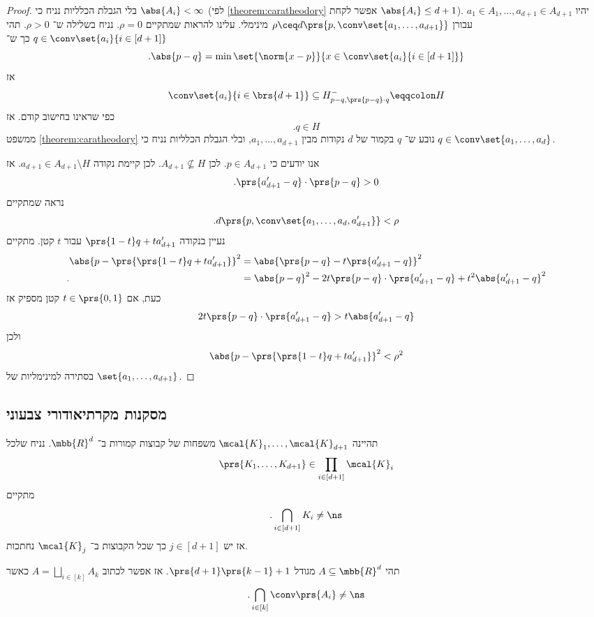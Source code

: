 \documentclass[a4paper,10pt,twoside,openany]{book}
\begin{document}
\begin{proof}
בלי הגבלת הכלליות נניח כי
$\abs{A_i} < \infty$
(לפי \ref{theorem:caratheodory} אפשר לקחת
$\abs{A_i} \leq d+1$).
יהיו
$a_1 \in A_1, \ldots, a_{d+1} \in A_{d+1}$
עבורן
$\rho \ceq d\prs{p, \conv\set{a_1, \ldots, a_{d+1}}}$
מינימלי.
עלינו להראות שמתקיים
$\rho = 0$.
נניח בשלילה ש־%
$\rho > 0$.
תהי
$q \in \conv\set{a_i}{i \in [d+1]}$
כך ש־%
\[\text{.} \abs{p-q} = \min\set{\norm{x-p}}{x \in \conv\set{a_i}{i \in [d+1]}}\]
אז
\[\conv\set{a_i}{i \in \brs{d+1}} \subseteq H_{p-q, \prs{p-q} \cdot q}^- \eqqcolon H\]
כפי שראינו בחישוב קודם.
אז
\[\text{.} q \in H\]
ממשפט
\ref{theorem:caratheodory}
נובע ש־%
$q$
בקמור של
$d$
נקודות מבין
$a_1, \ldots, a_{d+1}$,
ובלי הגבלת הכלליות נניח כי
$q \in \conv\set{a_1, \ldots, a_d}$.

אנו יודעים כי
$p \in A_{d+1}$.
לכן
$A_{d+1} \nsubseteq H$.
לכן קיימת נקודה
$a_{d+1} \in A_{d+1} \setminus H$.
אז
\[\text{.} \prs{a_{d+1}' - q} \cdot \prs{p-q} > 0\]
נראה שמתקיים
\[\text{.} d\prs{p, \conv\set{a_1, \ldots, a_d, a_{d+1}'}} < \rho\]
נעיין בנקודה
$\prs{1-t}q + t a_{d+1}'$
עבור
$t$
קטן.
מתקיים
\begin{align*}
\abs{p - \prs{\prs{1-t} q + ta_{d+1}'}}^2 &= \abs{\prs{p-q} - t \prs{a_{d+1}' - q}}^2
\\ \text{.} \hphantom{\abs{p - \prs{\prs{1-t} q + ta_{d+1}'}}^2} &= \abs{p-q}^2 - 2t \prs{p-q} \cdot \prs{a_{d+1}' - q} + t^2 \abs{a_{d+1}' - q}^2
\end{align*}
כעת, אם
$t \in \prs{0,1}$
קטן מספיק
אז
\[2t \prs{p-q} \cdot \prs{a_{d+1}' - q} > t \abs{a_{d+1}' - q}\]
ולכן
\[\abs{p - \prs{\prs{1-t} q + ta_{d+1}'}}^2 < \rho^2\]
בסתירה למינימליות של
$\set{a_1, \ldots, a_{d+1}}$.
\end{proof}

\subsection{מסקנות מקרתיאודורי צבעוני}

\begin{theorem}
תהיינה
$\mcal{K}_1, \ldots, \mcal{K}_{d+1}$
משפחות של קבוצות קמורות ב־%
$\mbb{R}^d$.
נניח שלכל
\[\prs{K_1, \ldots, K_{d+1}} \in \prod_{i \in [d+1]} \mcal{K}_i\]
מתקיים
\[\text{.} \bigcap_{i \in [d+1]} K_i \neq \ns\]
אז יש
$j \in [d+1]$
כך שכל הקבוצות ב־%
$\mcal{K}_j$
נחתכות.
\end{theorem}

\begin{theorem}[טברברג]
תהי
$A \subseteq \mbb{R}^d$
מגודל
$\prs{d+1}\prs{k-1} + 1$.
אז אפשר לכתוב
$A = \bigsqcup_{i \in [k]} A_k$
כאשר
\[\text{.} \bigcap_{i \in [k]} \conv\prs{A_i} \neq \ns\]
\end{theorem}

\backmatter
\end{document}
